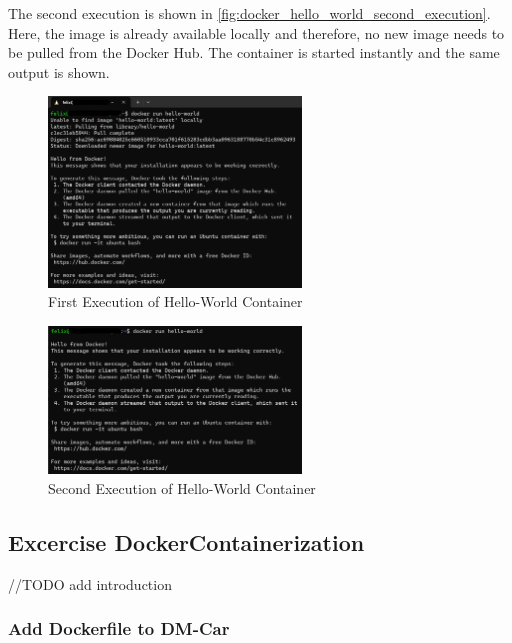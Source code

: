 The second execution is shown in \autoref*{fig:docker_hello_world_second_execution}.
Here, the image is already available locally and therefore, no new image needs to be pulled from the Docker Hub.
The container is started instantly and the same output is shown.

\begin{figure}
    \centering
    \includegraphics[width=0.6\textwidth]{figures/microservices/dmCar/ms_dmCar_dockerHelloWorldFirstExecution.png}
    \caption{First Execution of Hello-World Container}
    \label{fig:docker_hello_world_first_execution}
\end{figure}

\begin{figure}
    \centering
    \includegraphics[width=0.6\textwidth]{figures/microservices/dmCar/ms_dmCar_dockerHelloWorldSecondExecution.png}
    \caption{Second Execution of Hello-World Container}
    \label{fig:docker_hello_world_second_execution}
\end{figure}


\subsection{Excercise DockerContainerization}
//TODO add introduction
\subsubsection*{Add Dockerfile to DM-Car}

